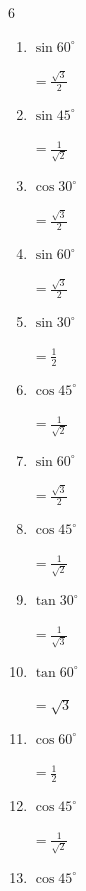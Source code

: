 \begin{multicols}{6}
\begin{enumerate}
\columnbreak %

  \item $\displaystyle \sin{60^\circ}$

        $\displaystyle =\frac{\sqrt{3}}{2}$

  \item $\displaystyle \sin{45^\circ}$

        $\displaystyle =\frac{1}{\sqrt{2}}$

  \item $\displaystyle \cos{30^\circ}$

        $\displaystyle =\frac{\sqrt{3}}{2}$

  \item $\displaystyle \sin{60^\circ}$

        $\displaystyle =\frac{\sqrt{3}}{2}$

  \item $\displaystyle \sin{30^\circ}$

        $\displaystyle =\frac{1}{2}$

  \item $\displaystyle \cos{45^\circ}$

        $\displaystyle =\frac{1}{\sqrt{2}}$

  \item $\displaystyle \sin{60^\circ}$

        $\displaystyle =\frac{\sqrt{3}}{2}$

  \item $\displaystyle \cos{45^\circ}$

        $\displaystyle =\frac{1}{\sqrt{2}}$

  \item $\displaystyle \tan{30^\circ}$

        $\displaystyle =\frac{1}{\sqrt{3}}$

  \item $\displaystyle \tan{60^\circ}$

        $\displaystyle =\sqrt{3}$

  \item $\displaystyle \cos{60^\circ}$

        $\displaystyle =\frac{1}{2}$

  \item $\displaystyle \cos{45^\circ}$

        $\displaystyle =\frac{1}{\sqrt{2}}$

  \item $\displaystyle \cos{45^\circ}$


\end{enumerate}
\end{multicols}
